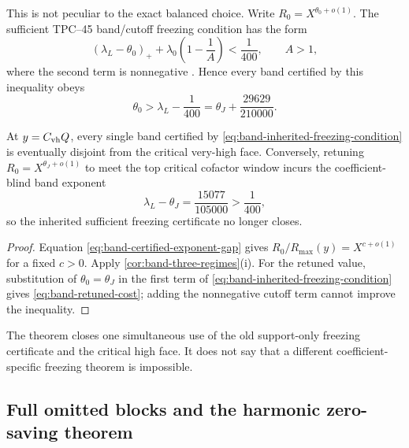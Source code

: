 This is not peculiar to the exact balanced choice.  Write
\(R_0=X^{\theta_0+o(1)}\).  The sufficient TPC--45 band/cutoff freezing
condition has the form
\begin{equation}
 (\lambda_L-\theta_0)_+
 +\lambda_0\left(1-\frac1A\right)<\frac1{400},
 \qquad A>1,
 \label{eq:band-inherited-freezing-condition}
\end{equation}
where the second term is nonnegative \citep{WangTPC45}.  Hence every band
certified by this inequality obeys
\begin{equation}
 \theta_0>\lambda_L-\frac1{400}
 =\theta_J+\frac{29629}{210000}.
 \label{eq:band-certified-exponent-gap}
\end{equation}

\begin{theorem}
\label{thm:band-endpoint-incompatibility}
At \(y=C_{\rm vh}Q\), every single band certified by
\eqref{eq:band-inherited-freezing-condition} is eventually disjoint from
the critical very-high face.  Conversely, retuning
\(R_0=X^{\theta_J+o(1)}\) to meet the top critical cofactor window incurs
the coefficient-blind band exponent
\begin{equation}
 \lambda_L-\theta_J
 =\frac{15077}{105000}
 >\frac1{400},
 \label{eq:band-retuned-cost}
\end{equation}
so the inherited sufficient freezing certificate no longer closes.
\end{theorem}

\begin{proof}
Equation \eqref{eq:band-certified-exponent-gap} gives
\(R_0/R_{\max}(y)=X^{c+o(1)}\) for a fixed \(c>0\).  Apply
\cref{cor:band-three-regimes}\textup{(i)}.  For the retuned value,
substitution of \(\theta_0=\theta_J\) in the first term of
\eqref{eq:band-inherited-freezing-condition} gives
\eqref{eq:band-retuned-cost}; adding the nonnegative cutoff term cannot
improve the inequality.
\end{proof}

The theorem closes one simultaneous use of the old support-only freezing
certificate and the critical high face.  It does not say that a different
coefficient-specific freezing theorem is impossible.

\subsection{Full omitted blocks and the harmonic zero-saving theorem}

